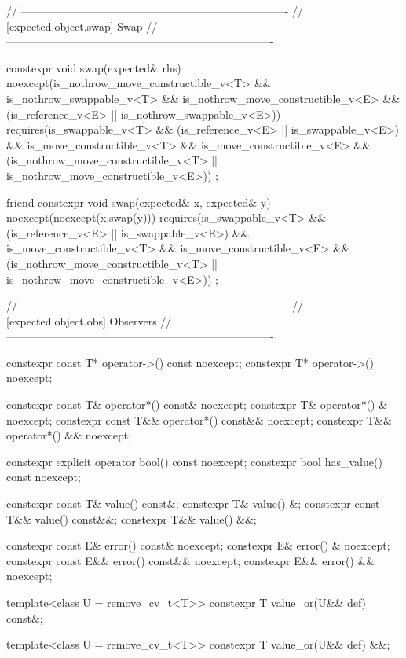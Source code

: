 \begin{codeblock}
{  // -------------------------------------------------------------------------
  // [expected.object.swap] Swap
  // -------------------------------------------------------------------------

  constexpr void swap(expected& rhs) noexcept(is_nothrow_move_constructible_v<T> &&
                                              is_nothrow_swappable_v<T> &&
                                              is_nothrow_move_constructible_v<E> &&
                                              (is_reference_v<E> ||
                                               is_nothrow_swappable_v<E>))
    requires(is_swappable_v<T> && (is_reference_v<E> || is_swappable_v<E>) &&
             is_move_constructible_v<T> && is_move_constructible_v<E> &&
             (is_nothrow_move_constructible_v<T> || is_nothrow_move_constructible_v<E>))
  ;

  friend constexpr void swap(expected& x, expected& y) noexcept(noexcept(x.swap(y)))
    requires(is_swappable_v<T> && (is_reference_v<E> || is_swappable_v<E>) &&
             is_move_constructible_v<T> && is_move_constructible_v<E> &&
             (is_nothrow_move_constructible_v<T> || is_nothrow_move_constructible_v<E>))
  ;

  // -------------------------------------------------------------------------
  // [expected.object.obs] Observers
  // -------------------------------------------------------------------------

  constexpr const T* operator->() const noexcept;
  constexpr T* operator->() noexcept;

  constexpr const T& operator*() const& noexcept;
  constexpr T& operator*() & noexcept;
  constexpr const T&& operator*() const&& noexcept;
  constexpr T&& operator*() && noexcept;

  constexpr explicit operator bool() const noexcept;
  constexpr bool has_value() const noexcept;

  constexpr const T& value() const&;
  constexpr T& value() &;
  constexpr const T&& value() const&&;
  constexpr T&& value() &&;

  constexpr const E& error() const& noexcept;
  constexpr E& error() & noexcept;
  constexpr const E&& error() const&& noexcept;
  constexpr E&& error() && noexcept;

  template<class U = remove_cv_t<T>> constexpr T value_or(U&& def) const&;

  template<class U = remove_cv_t<T>> constexpr T value_or(U&& def) &&;

}
\end{codeblock}
